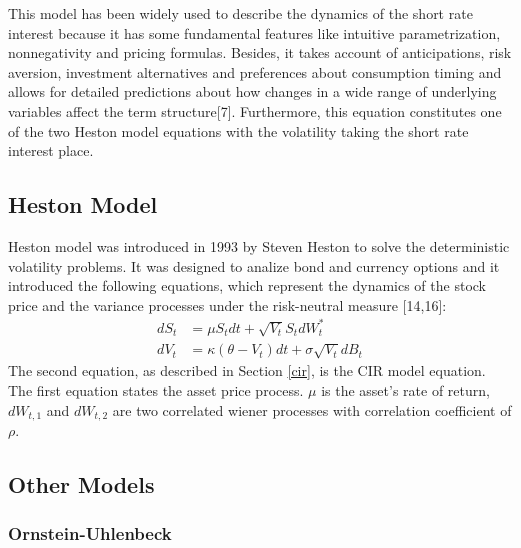 \documentclass[12pt,twoside]{reedthesis}
\theoremstyle{definition}
\theoremstyle{definition}
\theoremstyle{remark}
\begin{document}
  This model has been widely used to describe the dynamics of the short
  rate interest because it has some fundamental features like intuitive
  parametrization, nonnegativity and pricing formulas. Besides, it takes
  account of anticipations, risk aversion, investment alternatives and
  preferences about consumption timing and allows for detailed predictions
  about how changes in a wide range of underlying variables affect the
  term structure{[}7{]}. Furthermore, this equation constitutes one of the
  two Heston model equations with the volatility taking the short rate
  interest place.
  
  \subsection{Heston Model}\label{hes1}
  
  Heston model was introduced in 1993 by Steven Heston to solve the
  deterministic volatility problems. It was designed to analize bond and
  currency options and it introduced the following equations, which
  represent the dynamics of the stock price and the variance processes
  under the risk-neutral measure {[}14,16{]}:
  \begin{align}
  \label{eq:heston}
  dS_t &= \mu S_t dt + \sqrt{V_t} S_t dW^*_t \\
  dV_t &=  \kappa (\theta - V_t)dt + \sigma \sqrt{V_t} dB_t
  \label{eq:hesvar}
  \end{align}
  The second equation, as described in Section \ref{cir}, is the CIR model
  equation. The first equation states the asset price process. \(\mu\) is
  the asset's rate of return, \(dW_{t,1}\) and \(dW_{t,2}\) are two
  correlated wiener processes with correlation coefficient of \(\rho\).
  
  \subsection{Other Models}\label{other-models}
  
  \subsubsection{Ornstein-Uhlenbeck}\label{ornstein-uhlenbeck}
  
\end{document}
